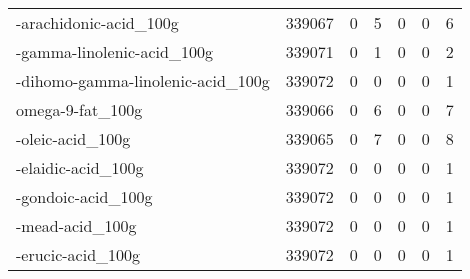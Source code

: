 \begin{tabular}{lrrrrrr}
-arachidonic-acid\_100g                     &                                        339067 &                                         0 &                                             5 &                                         0 &                      0 &                6 \\
-gamma-linolenic-acid\_100g                 &                                        339071 &                                         0 &                                             1 &                                         0 &                      0 &                2 \\
-dihomo-gamma-linolenic-acid\_100g          &                                        339072 &                                         0 &                                             0 &                                         0 &                      0 &                1 \\
omega-9-fat\_100g                           &                                        339066 &                                         0 &                                             6 &                                         0 &                      0 &                7 \\
-oleic-acid\_100g                           &                                        339065 &                                         0 &                                             7 &                                         0 &                      0 &                8 \\
-elaidic-acid\_100g                         &                                        339072 &                                         0 &                                             0 &                                         0 &                      0 &                1 \\
-gondoic-acid\_100g                         &                                        339072 &                                         0 &                                             0 &                                         0 &                      0 &                1 \\
-mead-acid\_100g                            &                                        339072 &                                         0 &                                             0 &                                         0 &                      0 &                1 \\
-erucic-acid\_100g                          &                                        339072 &                                         0 &                                             0 &                                         0 &                      0 &                1 \\

\end{tabular}
